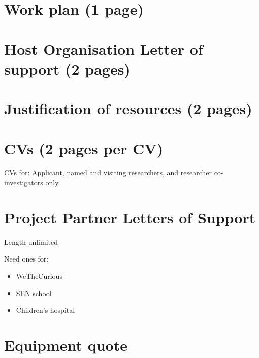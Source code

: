 \documentclass[11pt,a4paper]{report}
\begin{document}
\pagebreak


\pagebreak
\chapter{Work plan (1 page)}
\pagebreak


\begin{landscape}
\begin{figure}[!ht]
\resizebox{\linewidth}{!}{
    
}
\end{figure}
\end{landscape}
\pagebreak


\chapter{Host Organisation Letter of support (2 pages)}
\pagebreak

\chapter{Justification of resources (2 pages)}
\pagebreak

\pagebreak

\chapter{CVs (2 pages per CV)}

CVs for: Applicant, named and visiting researchers, and researcher
co-investigators only.
\pagebreak


\pagebreak


\chapter{Project Partner Letters of Support}

Length unlimited

Need ones for:

\begin{itemize}
    \item WeTheCurious
    \item SEN school
    \item Children's hospital
\end{itemize}
\pagebreak

\chapter{Equipment quote}
\end{document}
